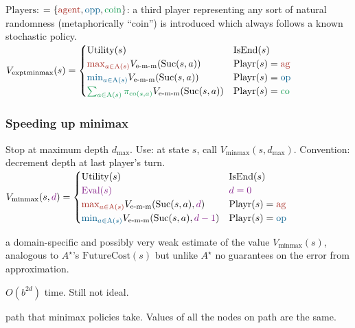  \textbf{$\text{Players}$}: $ =
\{\agentcolor{\text{agent}}, \oppcolor{\text{opp}},
\chancecolor{\text{coin}}\}$: a third player representing any sort of natural
randomness (metaphorically ``coin'') is introduced which always follows a known
stochastic policy.
$V_{\text{exptminmax}}(s) = \begin{cases}
    \text{Utility}(s) & \text{IsEnd}(s) \\
    \agentcolor{\max_{a \in \text{A}(s)}} V_{\text{e-m-m}}(\text{Suc}(s, a)) & \text{Playr}(s) = \agentcolor{\text{ag}} \\
    \oppcolor{\min_{a \in \text{A}(s)}} V_{\text{e-m-m}}(\text{Suc}(s, a)) & \text{Playr}(s) = \oppcolor{\text{op}} \\
    \chancecolor{\sum_{a \in \text{A}(s)} \pi_{\text{co}(s,a)}} V_{\text{e-m-m}}(\text{Suc}(s, a)) & \text{Playr}(s) = \chancecolor{\text{co}}
\end{cases}$

\subsubsection{Speeding up minimax}

 Stop at maximum depth $d_{\text{max}}$. Use:
at state $s$, call $V_{\text{minmax}}(s, d_{\text{max}})$. Convention: decrement
depth at last player's turn.
$V_{\text{minmax}}(s, \dcolor{d}) = \begin{cases}
    \text{Utility}(s) & \text{IsEnd}(s) \\
    \dcolor{\text{Eval}(s)} & \dcolor{d = 0}\\
    \agentcolor{\max_{a \in \text{A}(s)}} V_{\text{e-m-m}}(\text{Suc}(s, a), \dcolor{d}) & \text{Playr}(s) = \agentcolor{\text{ag}} \\
    \oppcolor{\min_{a \in \text{A}(s)}} V_{\text{e-m-m}}(\text{Suc}(s, a), \dcolor{d-1}) & \text{Playr}(s) = \oppcolor{\text{op}} \\
\end{cases}$

 a domain-specific and possibly very weak estimate of
the value $V_{\text{minmax}}(s)$, analogous to $A^\star$'s
$\text{FutureCost}(s)$ but unlike $A^\star$ no guarantees on the error from
approximation.

 $O(b^{2d})$ time. Still not ideal.

 path that minimax policies take. Values of all the nodes on
path are the same.

